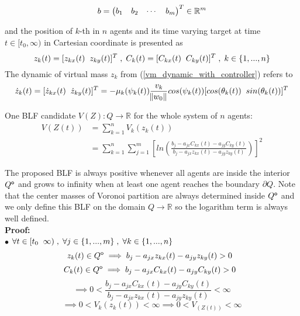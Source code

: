\begin{equation} \notag
b = 
\begin{pmatrix}
b_1 & b_2 & \cdots & b_m
\end{pmatrix}^T \in \mathbb{R}^{m}
\end{equation}

\noindent and the position of ${k}$-th in ${n}$ agents and its time varying target at time ${t \in [t_0, \infty)}$ in Cartesian coordinate is presented as \\
\begin{equation} \notag
z_k(t) = [z_{kx}(t) \txtspc{ } z_{ky}(t)]^T \txtspc{,} C_k(t) = [C_{kx}(t) \txtspc{ } C_{ky}(t)]^T \txtspc{,} k \in \{1,...,n\}
\end{equation}
The dynamic of virtual mass ${z_k}$ from (\ref{vm_dynamic_with_controller}) refers to \\
\begin{equation} \label{vm_derivatve}
\dot z_k(t) = [\dot z_{kx}(t) \txtspc{ } \dot z_{ky}(t)]^T = -\mu_k(\psi_{k}(t))\frac{v_k}{\norm{w_0}}cos(\psi_{k}(t))[cos(\theta_{k}(t)) \txtspc{ } sin(\theta_{k}(t))]^T \\
\end{equation}

\noindent One BLF candidate ${V(Z): Q \rightarrow \mathbb{R}}$  for the whole system of ${n}$ agents:
\begin{equation} \label{barrier_lyapunov}
\begin{split}
V(Z(t)) & = \displaystyle\sum_{k=1}^{n} V_k(z_k(t)) \\
& = \displaystyle\sum_{k=1}^{n} \displaystyle\sum_{j=1}^{m} [ln(\frac{b_j - a_{jx}C_{kx}(t) - a_{jy}C_{ky}(t)}{b_j - a_{jx}z_{kx}(t) - a_{jy}z_{ky}(t)})]^2
\end{split}
\end{equation}

\noindent The proposed BLF is always positive whenever all agents are inside the interior ${Q^{\mathsf{o}}}$ and grows to infinity when at least one agent reaches the boundary ${\partial{Q}}$. Note that the center masses of Voronoi partition are always determined inside ${Q^{\mathsf{o}}}$ and we only define this BLF on the domain ${Q \rightarrow \mathbb{R}}$ so the logarithm term is always well defined.\\  
\textbf{Proof:} \\
\noindent $\bullet$ ${\forall t \in [t_0 \txtspc{ } \infty) \txtspc{,} \forall j \in \{1,...,m\} \txtspc{,} \forall  k \in \{1,...,n\}}$ \\
\[z_k(t) \in \interior{Q} \implies b_j - a_{jx}z_{kx}(t) - a_{jy}z_{ky}(t) > 0 \txtspc{ }\] 
\[C_k(t) \in \interior{Q} \implies b_j - a_{jx}C_{kx}(t) - a_{jy}C_{ky}(t) > 0 \txtspc{ }\]
\[\implies 0 < \frac{b_j - a_{jx}C_{kx}(t) - a_{jy}C_{ky}(t)}{b_j - a_{jx}z_{kx}(t) - a_{jy}z_{ky}(t)} < \infty\]
\[\implies 0 < V_k(z_k(t)) < \infty \implies 0 < V_(Z(t)) < \infty\]

